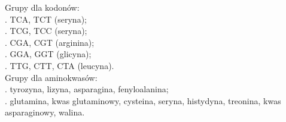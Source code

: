 \documentclass[compress,clock,xcolor=dvipsnames,hyperref={pdfpagelabels=false},final]{beamer}
\begin{document}
\begin{frame}

\pause
 \indent Grupy dla kodonów:\\
. TCA, TCT (seryna);\\
. TCG, TCC (seryna);\\
. CGA, CGT (arginina);\\
. GGA, GGT (glicyna);\\
. TTG, CTT, CTA (leucyna).\\
 \pause Grupy dla aminokwasów:\\
. tyrozyna, lizyna, asparagina, fenyloalanina;\\
. glutamina, kwas glutaminowy, cysteina, seryna, histydyna, treonina, kwas asparaginowy, walina.
\end{frame}

\begin{frame}
\begin{center}
\\
\end{center}
\end{frame}
\end{document}
